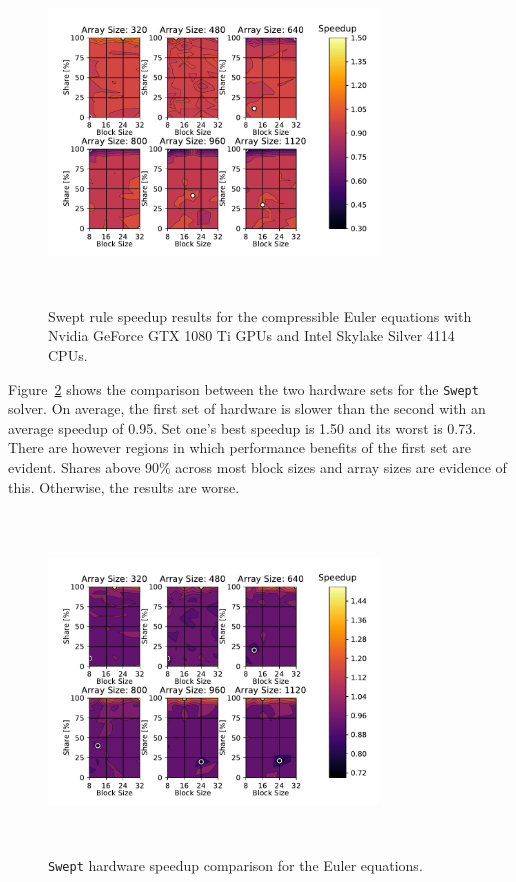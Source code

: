 \documentclass[preprints,article,accept,moreauthors,pdftex]{Definitions/mdpi}
\def\Swept{\texttt{Swept}}
\def\oldCPU{Intel Skylake Silver 4114} %
\def\oldGPU{Nvidia GeForce GTX 1080 Ti}
\begin{document}
\begin{figure}[H]
    
    \begin{center}
        \includegraphics[height=9cm,width=0.78\textwidth, trim={0.75cm 0.4cm 0.8cm 0.7cm},clip]{figs/speedUpeulerOld.pdf}
        \caption{Swept rule speedup results  for the compressible Euler equations with \oldGPU{} GPUs and \oldCPU{} CPUs.}
        \label{fig:oldSpeedupEuler}
    \end{center}
\end{figure}




Figure~\ref{fig:eulerHardwareComp} shows the comparison between the two hardware sets for the \Swept{} solver. On average, the first set of hardware is slower than the second with an average speedup of 0.95. Set one's best speedup is 1.50 and its worst is 0.73. There are however regions in which performance benefits of the first set are evident. Shares above 90\% across most block sizes and array sizes are evidence of this. Otherwise, the results are worse. 

\begin{figure}[H]
    
    \begin{center}
        \includegraphics[height=9cm,width=0.78\textwidth, trim={0.75cm 0.4cm 0.8cm 0.7cm},clip]{figs/hardwareSpeedUpeuler.pdf}
        \caption{\Swept{} hardware speedup comparison for the Euler equations.}
        \label{fig:eulerHardwareComp}
    \end{center}
\end{figure}
\end{document}
